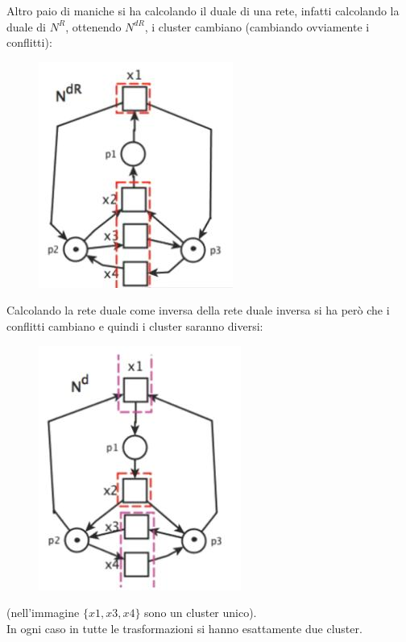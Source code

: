 \documentclass[a4paper,12pt, oneside]{book}
\begin{document}
\begin{esempio}
\begin{figure}[H]
  \end{figure}
  Altro paio di maniche si ha calcolando il duale di una rete, infatti
  calcolando la duale di $N^R$, ottenendo $N^{dR}$, i cluster cambiano
  (cambiando ovviamente i conflitti):
  \begin{figure}[H]
    \centering
    \includegraphics[scale = 0.5]{img/dr17.jpg}
  \end{figure}
  \newpage
  Calcolando la rete duale come inversa della rete duale inversa si ha però che
  i conflitti cambiano e quindi i cluster saranno diversi:
  \begin{figure}[H]
    \centering
    \includegraphics[scale = 0.5]{img/dr18.jpg}
  \end{figure}
  (nell'immagine $\{x1,x3,x4\}$ sono un cluster unico).\\
  In ogni caso in tutte le trasformazioni si hanno esattamente due cluster.
\end{esempio}
\end{document}
